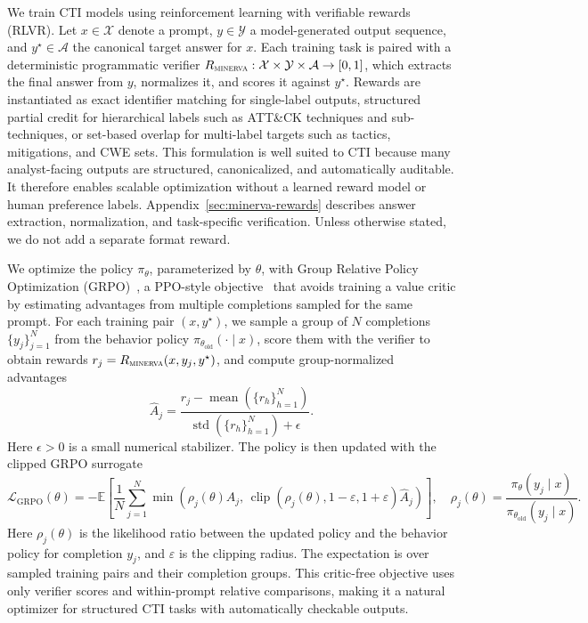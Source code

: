 We train CTI models using reinforcement learning with verifiable rewards (RLVR). Let $x\in\mathcal{X}$ denote a prompt, $y\in\mathcal{Y}$ a model-generated output sequence, and $y^\star\in\mathcal{A}$ the canonical target answer for $x$. Each training task is paired with a deterministic programmatic verifier $R_{\textsc{minerva}}:\mathcal{X}\times\mathcal{Y}\times\mathcal{A}\to[0,1]$, which extracts the final answer from $y$, normalizes it, and scores it against $y^\star$. Rewards are instantiated as exact identifier matching for single-label outputs, structured partial credit for hierarchical labels such as ATT\&CK techniques and sub-techniques, or set-based overlap for multi-label targets such as tactics, mitigations, and CWE sets. This formulation is well suited to CTI because many analyst-facing outputs are structured, canonicalized, and automatically auditable. It therefore enables scalable optimization without a learned reward model or human preference labels. Appendix~\ref{sec:minerva-rewards} describes answer extraction, normalization, and task-specific verification. Unless otherwise stated, we do not add a separate format reward.



We optimize the policy $\pi_\theta$, parameterized by $\theta$, with Group Relative Policy Optimization (GRPO)~\citep{shao2024deepseekmath,deepseekr1}, a PPO-style objective~\citep{schulman2017ppo} that avoids training a value critic by estimating advantages from multiple completions sampled for the same prompt. For each training pair $(x,y^\star)$, we sample a group of $N$ completions $\{y_j\}_{j=1}^{N}$ from the behavior policy $\pi_{\theta_{\mathrm{old}}}(\cdot\mid x)$, score them with the verifier to obtain rewards $r_j=R_{\textsc{minerva}}(x,y_j,y^\star)$, and compute group-normalized advantages
\begin{equation}
    \hat{A}_j
    =
    \frac{r_j - \operatorname{mean}(\{r_h\}_{h=1}^{N})}
    {\operatorname{std}(\{r_h\}_{h=1}^{N}) + \epsilon}.
\end{equation}
Here $\epsilon>0$ is a small numerical stabilizer. The policy is then updated with the clipped GRPO surrogate
\begin{equation}
\label{eq:grpo-objective}
    \mathcal{L}_{\mathrm{GRPO}}(\theta)
    =
    - \mathbb{E}
    \left[
    \frac{1}{N}\sum_{j=1}^{N}
    \min\left(
        \rho_j(\theta)\hat{A}_j,\,
        \operatorname{clip}\!\left(\rho_j(\theta),1-\varepsilon,1+\varepsilon\right)\hat{A}_j
    \right)
    \right],
    \quad
    \rho_j(\theta)=
    \frac{\pi_\theta(y_j\mid x)}
    {\pi_{\theta_{\mathrm{old}}}(y_j\mid x)} .
\end{equation}
Here $\rho_j(\theta)$ is the likelihood ratio between the updated policy and the behavior policy for completion $y_j$, and $\varepsilon$ is the clipping radius.
The expectation is over sampled training pairs and their completion groups. This critic-free objective uses only verifier scores and within-prompt relative comparisons, making it a natural optimizer for structured CTI tasks with automatically checkable outputs.





